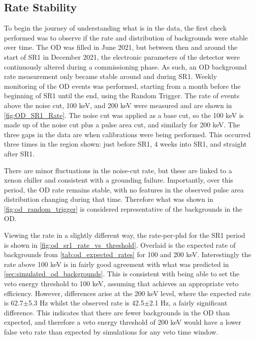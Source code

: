 \subsection{Rate Stability}
\par
To begin the journey of understanding what is in the data, the first check performed was to observe if the rate and distribution of backgrounds were stable over time.
The OD was filled in June 2021, but between then and around the start of SR1 in December 2021, the electronic parameters of the detector were continuously altered during a commissioning phase.
As such, an OD background rate measurement only became stable around and during SR1.
Weekly monitoring of the OD events was performed, starting from a month before the beginning of SR1 until the end, using the Random Trigger.
The rate of events above the noise cut, 100 keV, and 200 keV were measured and are shown in \autoref{fig:OD_SR1_Rate}.
The noise cut was applied as a base cut, so the 100 keV is made up of the noise cut plus a pulse area cut, and similarly for 200 keV.
The three gaps in the data are when calibrations were being performed.
This occurred three times in the region shown: just before SR1, 4 weeks into SR1, and straight after SR1.
\par
There are minor fluctuations in the noise-cut rate, but these are linked to a xenon chiller and consistent with a grounding failure.
Importantly, over this period, the OD rate remains stable, with no features in the observed pulse area distribution changing during that time.
Therefore what was shown in \autoref{fig:od_random_trigger} is considered representative of the backgrounds in the OD.
\par
Viewing the rate in a slightly different way, the rate-per-phd for the SR1 period is shown in \autoref{fig:od_sr1_rate_vs_threshold}.
Overlaid is the expected rate of backgrounds from \autoref{tab:od_expected_rates} for 100 and 200 keV.
Interestingly the rate above 100 keV is in fairly good agreement with what was predicted in \autoref{sec:simulated_od_backgrounds}.
This is consistent with being able to set the veto energy threshold to 100 keV, assuming that achieves an appropriate veto efficiency.
However, differences arise at the 200 keV level, where the expected rate is 62.7$\pm$5.3 Hz whilst the observed rate is 42.5$\pm$2.1 Hz, a fairly significant difference.
This indicates that there are fewer backgrounds in the OD than expected, and therefore a veto energy threshold of 200 keV would have a lower false veto rate than expected by simulations for any veto time window.

